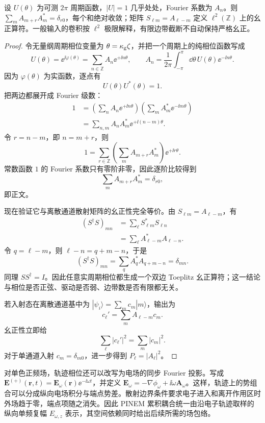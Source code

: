 \begin{theorem}
设 $U(\theta)$ 为可测 $2\pi$ 周期函数，$|U|=1$ 几乎处处，Fourier 系数为 $A_n$。则 $\sum_m A_{m+r}A_m^*=\delta_{r0}$，每个和绝对收敛；矩阵 $S_{\ell m}=A_{\ell-m}$ 定义 $\ell^2(\mathbb Z)$ 上的幺正算符。一般输入的卷积按 $\ell^2$ 极限解释，有限边带截断不自动保持严格幺正。
\end{theorem}
\begin{proof}
令无量纲周期相位变量为 $\theta=\kappa_{\rm g}\zeta$，并把一个周期上的纯相位函数写成
\[
U(\theta)=\ee^{\ii\varphi(\theta)}
=\sum_{n\in\mathbb Z}A_n\ee^{+\ii n\theta},
\qquad
A_n=\frac1{2\pi}\int_{-\pi}^{\pi}\dd\theta\,
U(\theta)\ee^{-\ii n\theta}.
\]
因为 $\varphi(\theta)$ 为实函数，逐点有
\[
U(\theta)U^*(\theta)=1.
\]
把两边都展开成 Fourier 级数：
\begin{align*}
1
&=\left(\sum_nA_n\ee^{+\ii n\theta}\right)
  \left(\sum_mA_m^*\ee^{-\ii m\theta}\right)\\
&=\sum_{n,m}A_nA_m^*\ee^{+\ii(n-m)\theta}.
\end{align*}
令 $r=n-m$，即 $n=m+r$，则
\[
1
=\sum_{r\in\mathbb Z}
\left(\sum_mA_{m+r}A_m^*\right)
\ee^{+\ii r\theta}.
\]
常数函数 $1$ 的 Fourier 系数只有零阶非零，因此逐阶比较得到
\[
\sum_mA_{m+r}A_m^*=\delta_{r0},
\]
即正文。

现在验证它与离散通道散射矩阵的幺正性完全等价。由
$S_{\ell m}=A_{\ell-m}$，有
\begin{align*}
(S^\dagger S)_{mn}
&=\sum_\ell S_{\ell m}^*S_{\ell n}\\
&=\sum_\ell A_{\ell-m}^*A_{\ell-n}.
\end{align*}
令 $q=\ell-m$，则 $\ell-n=q+m-n$，于是
\[
(S^\dagger S)_{mn}
=\sum_q A_q^*A_{q+m-n}
=\delta_{mn}.
\]
同理 $SS^\dagger=I$。因此任意实周期相位都生成一个双边 Toeplitz 幺正算符；这一结论与相位是否正弦、驱动是否弱、边带数是否有限都无关。

若入射态在离散通道基中为 $|\psi_i\rangle=\sum_m c_m|m\rangle$，输出为
\[
c_\ell'=
\sum_mA_{\ell-m}c_m.
\]
幺正性立即给
\[
\sum_\ell|c_\ell'|^2
=\sum_m|c_m|^2.
\]
对于单通道入射 $c_m=\delta_{m0}$，进一步得到 $P_\ell=|A_\ell|^2$。
\end{proof}


对单色正频场，轨迹相位还可以改写为电场的同步 Fourier 投影。写成
$\mathbf E^{(+)}(\mathbf r,t)=\mathbf E_\omega(\mathbf r)\ee^{-\ii\omega t}$，并定义
$\mathbf E_\omega=-\nabla\phi_\omega+\ii\omega\mathbf A_\omega$。这样，轨迹上的势组合可以分成纵向电场积分与端点势差。散射边界条件要求电子进入和离开作用区时外场趋于零，端点项随之消失。因此 PINEM 累积耦合统一由沿电子轨迹取样的纵向单频复幅 $E_{\omega,z}$ 表示，其空间依赖同时给出后续所需的场包络。

